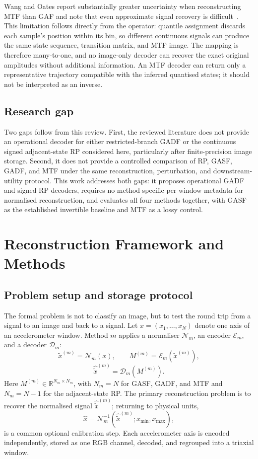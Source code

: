 \documentclass[preprint,12pt]{elsarticle}
\begin{document}
Wang and Oates report substantially greater uncertainty when reconstructing MTF than GAF and note that even approximate signal recovery is difficult~\cite{wang2015encoding}. This limitation follows directly from the operator: quantile assignment discards each sample's position within its bin, so different continuous signals can produce the same state sequence, transition matrix, and MTF image. The mapping is therefore many-to-one, and no image-only decoder can recover the exact original amplitudes without additional information. An MTF decoder can return only a representative trajectory compatible with the inferred quantised states; it should not be interpreted as an inverse.


\subsection{Research gap}\label{sec:research_gap}
Two gaps follow from this review. First, the reviewed literature does not provide an operational decoder for either restricted-branch GADF or the continuous signed adjacent-state RP considered here, particularly after finite-precision image storage. Second, it does not provide a controlled comparison of RP, GASF, GADF, and MTF under the same reconstruction, perturbation, and downstream-utility protocol. This work addresses both gaps: it proposes operational GADF and signed-RP decoders, requires no method-specific per-window metadata for normalised reconstruction, and evaluates all four methods together, with GASF as the established invertible baseline and MTF as a lossy control.

\section{Reconstruction Framework and Methods}\label{sec:proposed_methods}

\subsection{Problem setup and storage protocol}\label{sec:shared_protocol}

The formal problem is not to classify an image, but to test the round trip from a signal to an image and back to a signal. Let \(x=(x_1,\ldots,x_N)\) denote one axis of an accelerometer window. Method \(m\) applies a normaliser \(\mathcal N_m\), an encoder \(\mathcal E_m\), and a decoder \(\mathcal D_m\):
\[
\tilde x^{(m)}=\mathcal N_m(x),\qquad
M^{(m)}=\mathcal E_m(\tilde x^{(m)}),
\]
\[
\hat{\tilde x}^{(m)}=\mathcal D_m(M^{(m)}).
\]
Here \(M^{(m)}\in\mathbb R^{N_m\times N_m}\), with \(N_m=N\) for GASF, GADF, and MTF and \(N_m=N-1\) for the adjacent-state RP\@. The primary reconstruction problem is to recover the normalised signal \(\hat{\tilde x}^{(m)}\); returning to physical units,
\[
\hat x=\mathcal N_m^{-1}(\hat{\tilde x}^{(m)};x_{\min},x_{\max}),
\]
is a common optional calibration step. Each accelerometer axis is encoded independently, stored as one RGB channel, decoded, and regrouped into a triaxial window.
\end{document}
